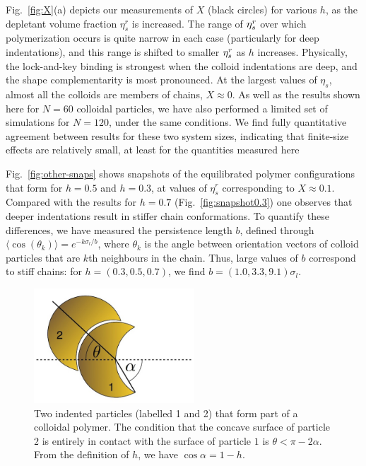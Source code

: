 \documentclass[8.5pt,oneside,onecolumn]{article}
\begin{document}
Fig.~\ref{fig:X}(a) depicts our measurements of $X$ (black circles) for
various $h$, as the depletant volume fraction $\eta_s^r$ is
increased. The range of $\eta_s^r$ over which polymerization occurs is
quite narrow in each case (particularly for deep indentations), and
this range is shifted to smaller $\eta_s^r$ as $h$ increases.  Physically,
the lock-and-key binding is strongest when the colloid indentations
are deep, and the shape complementarity is most pronounced.  At the
largest values of $\eta_s$, almost all the colloids are members of
chains, $X\approx 0$.  As well as the results shown here for $N=60$ colloidal particles, we have also performed a limited set of simulations for $N=120$, under the same conditions. We find fully quantitative agreement between results for these two system sizes, indicating that finite-size effects are relatively small, at least for the quantities measured here

Fig.~\ref{fig:other-snaps} shows snapshots of the equilibrated polymer
configurations that form for $h=0.5$ and $h=0.3$, at values of
$\eta_s^r$ corresponding to $X\approx 0.1$. Compared with the results
for $h=0.7$ (Fig.~\ref{fig:snapshot0.3}) one observes that deeper
indentations result in stiffer chain conformations. To quantify these
differences, we have measured the persistence length $b$, defined
through $\langle \cos(\theta_k)\rangle=e^{-k\sigma_l/b}$, where $\theta_k$ is
the angle between orientation vectors of colloid particles that are
$k$th neighbours in the chain. Thus, large values of $b$ correspond to
stiff chains: for $h=(0.3,0.5,0.7)$, we find
$b=(1.0,3.3,9.1)\sigma_l$. 


\begin{figure} 
\includegraphics[width=6cm]{Fig5.jpg}
  \caption{Two indented particles (labelled 1 and 2) that form part of a colloidal polymer.
  The condition that the concave surface of particle $2$ is entirely in contact with the surface
  of particle $1$ is $\theta < \pi-2\alpha$.  From the definition of $h$, we have $\cos\alpha = 1-h$.
  }
  \label{fig:persist}
\end{figure}
\end{document}
